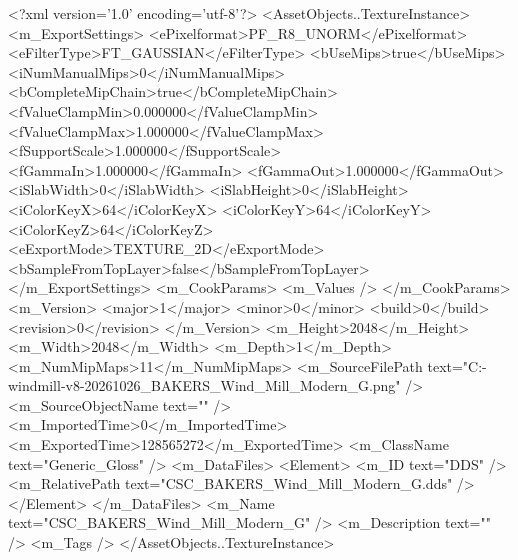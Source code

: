 <?xml version='1.0' encoding='utf-8'?>
<AssetObjects..TextureInstance>
  <m_ExportSettings>
    <ePixelformat>PF_R8_UNORM</ePixelformat>
    <eFilterType>FT_GAUSSIAN</eFilterType>
    <bUseMips>true</bUseMips>
    <iNumManualMips>0</iNumManualMips>
    <bCompleteMipChain>true</bCompleteMipChain>
    <fValueClampMin>0.000000</fValueClampMin>
    <fValueClampMax>1.000000</fValueClampMax>
    <fSupportScale>1.000000</fSupportScale>
    <fGammaIn>1.000000</fGammaIn>
    <fGammaOut>1.000000</fGammaOut>
    <iSlabWidth>0</iSlabWidth>
    <iSlabHeight>0</iSlabHeight>
    <iColorKeyX>64</iColorKeyX>
    <iColorKeyY>64</iColorKeyY>
    <iColorKeyZ>64</iColorKeyZ>
    <eExportMode>TEXTURE_2D</eExportMode>
    <bSampleFromTopLayer>false</bSampleFromTopLayer>
  </m_ExportSettings>
  <m_CookParams>
    <m_Values />
  </m_CookParams>
  <m_Version>
    <major>1</major>
    <minor>0</minor>
    <build>0</build>
    <revision>0</revision>
  </m_Version>
  <m_Height>2048</m_Height>
  <m_Width>2048</m_Width>
  <m_Depth>1</m_Depth>
  <m_NumMipMaps>11</m_NumMipMaps>
  <m_SourceFilePath text="C:\Users\Shadow\Desktop\Codex\modern-windmill-v8-20261026\export\textures\CSC_BAKERS_Wind_Mill_Modern_G.png" />
  <m_SourceObjectName text="" />
  <m_ImportedTime>0</m_ImportedTime>
  <m_ExportedTime>128565272</m_ExportedTime>
  <m_ClassName text="Generic_Gloss" />
  <m_DataFiles>
    <Element>
      <m_ID text="DDS" />
      <m_RelativePath text="CSC_BAKERS_Wind_Mill_Modern_G.dds" />
    </Element>
  </m_DataFiles>
  <m_Name text="CSC_BAKERS_Wind_Mill_Modern_G" />
  <m_Description text="" />
  <m_Tags />
</AssetObjects..TextureInstance>
